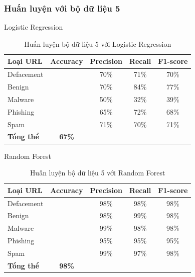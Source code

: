 \documentclass[13pt]{article}
\begin{document}
\subsubsection{Huấn luyện với bộ dữ liệu 5}
Logistic Regression
\begin{table}[h]
    \centering
    \renewcommand{\arraystretch}{1.3} %
    \begin{tabular}{|l|c|c|c|c|}
        \hline
        \rowcolor[HTML]{C0C0C0} %
        \textbf{Loại URL} & \textbf{Accuracy} & \textbf{Precision} & \textbf{Recall} & \textbf{F1-score} \\ 
        \hline
        Defacement &  & 70\% & 71\% & 70\% \\ 
        \hline
        Benign &  & 70\% & 84\% & 77\% \\ 
        \hline
        Malware &  & 50\% & 32\% & 39\% \\ 
        \hline
        Phishing &  & 65\% & 72\% & 68\% \\ 
        \hline
        Spam &  & 71\% & 70\% & 71\% \\ 
        \hline
        \textbf{Tổng thể} & \textbf{67\%} &  &  &  \\ 
        \hline
    \end{tabular}
    \caption{Huấn luyện bộ dữ liệu 5 với Logistic Regression}
    \label{tab:logistic_regression}
\end{table}

Random Forest
\begin{table}[h]
    \centering
    \renewcommand{\arraystretch}{1.3} %
    \begin{tabular}{|l|c|c|c|c|}
        \hline
        \rowcolor[HTML]{C0C0C0} %
        \textbf{Loại URL} & \textbf{Accuracy} & \textbf{Precision} & \textbf{Recall} & \textbf{F1-score} \\ 
        \hline
        Defacement &  & 98\% & 98\% & 98\% \\ 
        \hline
        Benign &  & 98\% & 99\% & 98\% \\ 
        \hline
        Malware &  & 99\% & 98\% & 98\% \\ 
        \hline
        Phishing &  & 95\% & 95\% & 95\% \\ 
        \hline
        Spam &  & 99\% & 97\% & 98\% \\ 
        \hline
        \textbf{Tổng thể} & \textbf{98\%} &  &  &  \\ 
        \hline
    \end{tabular}
    \caption{Huấn luyện bộ dữ liệu 5 với Random Forest}
    \label{tab:logistic_regression}
\end{table}
\end{document}
